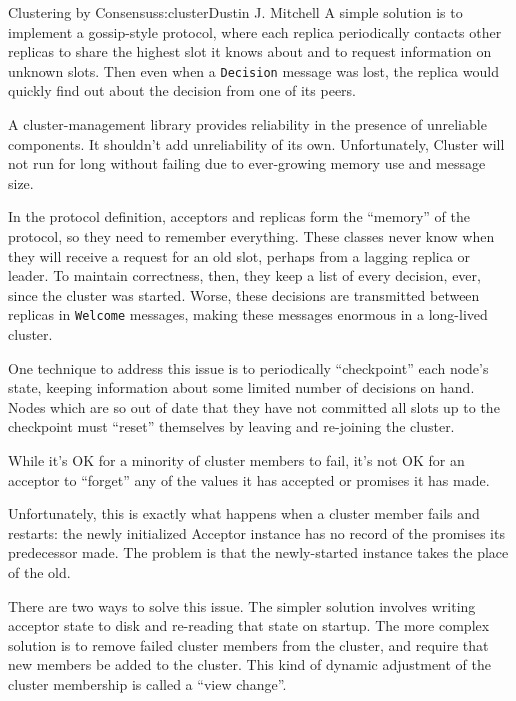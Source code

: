 \begin{aosachapter}{Clustering by Consensus}{s:cluster}{Dustin J. Mitchell}
A simple solution is to implement a gossip-style protocol, where each
replica periodically contacts other replicas to share the highest slot
it knows about and to request information on unknown slots. Then even
when a \texttt{Decision} message was lost, the replica would quickly
find out about the decision from one of its peers.

\label{consistent-memory-usage}

A cluster-management library provides reliability in the presence of
unreliable components. It shouldn't add unreliability of its own.
Unfortunately, Cluster will not run for long without failing due to
ever-growing memory use and message size.

In the protocol definition, acceptors and replicas form the ``memory''
of the protocol, so they need to remember everything. These classes
never know when they will receive a request for an old slot, perhaps
from a lagging replica or leader. To maintain correctness, then, they
keep a list of every decision, ever, since the cluster was started.
Worse, these decisions are transmitted between replicas in
\texttt{Welcome} messages, making these messages enormous in a
long-lived cluster.

One technique to address this issue is to periodically ``checkpoint''
each node's state, keeping information about some limited number of
decisions on hand. Nodes which are so out of date that they have not
committed all slots up to the checkpoint must ``reset'' themselves by
leaving and re-joining the cluster.

\label{persistent-storage}

While it's OK for a minority of cluster members to fail, it's not OK for
an acceptor to ``forget'' any of the values it has accepted or promises
it has made.

Unfortunately, this is exactly what happens when a cluster member fails
and restarts: the newly initialized Acceptor instance has no record of
the promises its predecessor made. The problem is that the newly-started
instance takes the place of the old.

There are two ways to solve this issue. The simpler solution involves
writing acceptor state to disk and re-reading that state on startup. The
more complex solution is to remove failed cluster members from the
cluster, and require that new members be added to the cluster. This kind
of dynamic adjustment of the cluster membership is called a ``view
change''.


\end{aosachapter}
